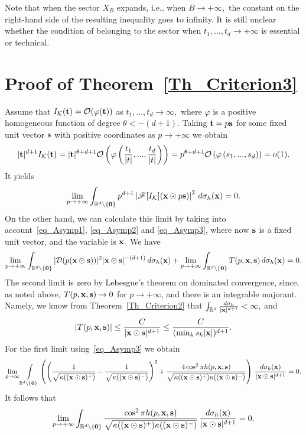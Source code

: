 \documentclass[12pt]{article}
\begin{document}
Note that when the sector $X_B$ expands, i.e., when $B\to+\infty,$ the constant on the right-hand side of the resulting inequality goes to infinity. It is still unclear whether the condition of belonging to the sector when ${{t_1,...,t_d}\to+\infty}$ is essential or technical.


\section{Proof of Theorem~\ref{Th_Criterion3}}

Assume that ${I_{\mathcal{K}}({\bf t})=\mathcal{O}(\varphi({\bf t}))}$ as ${t_1,...,t_d\to\infty},$ where $\varphi$ is a positive homogeneous function of degree ${\theta<-(d+1)}.$ Taking ${\bf t}=p{\bf s}$ for some fixed unit vector ${\bf s}$ with positive coordinates as ${p\to+\infty}$ we obtain
$$
|{\bf t}|^{d+1}I_{\mathcal{K}}({\bf t})=|{{\bf t}}|^{\theta+d+1}\mathcal{O}\left(\varphi\left(\frac{t_1}{|t|},...,\frac{t_d}{|t|}\right)\right)=p^{\theta+d+1}\mathcal{O}\left(\varphi\left(s_1,...,s_d\right)\right)=o(1).
$$
It yields 
$$
\lim_{p\to+\infty}\int_{\mathbb{R}^d\setminus\{{\bf0}\}}p^{d+1}\left|\mathscr{F}[I_{\mathcal{K}}]({\bf x}\odot p{\bf s})\right|^2\,d\sigma_h({\bf x})=0.
$$
On the other hand, we can calculate this limit by taking into account~\eqref{eq_Asymp1}, \eqref{eq_Asymp2} and \eqref{eq_Asymp3}, where now ${\bf s}$ is a fixed unit vector, and the variable is ${\bf x}.$
We have
$$
\lim_{p\to+\infty}\int_{\mathbb{R}^d\setminus\{{\bf0}\}}|\mathcal{D}(p({\bf x}\odot{\bf s}))|^2|{\bf x}\odot {\bf s}|^{-(d+1)}\,d\sigma_h({\bf x})+\lim_{p\to+\infty}\int_{\mathbb{R}^d\setminus\{{\bf0}\}}T(p,{\bf x},{\bf s})\,d\sigma_h({\bf x})=0.
$$
The second limit is zero by Lebesgue's theorem on dominated convergence, since, as noted above, ${T(p,{\bf x},{\bf s})\to0}$ for ${p\to+\infty}$, and there is an integrable majorant. Namely, we know from Theorem~\ref{Th_Criterion2} that ${\int_{\mathbb{R}^d}\frac{d\sigma_h}{|{\bf x}|^{d+1}}<\infty},$ and
$$
|T(p,{\bf x},{\bf s})|\leq\frac{C}{|{\bf x}\odot{\bf s}|^{d+1}}\leq\frac{C}{(\min_k s_k|{\bf x}|)^{d+1}}.
$$
For the first limit using~\eqref{eq_Asymp3} we obtain
$$
\lim_{p\to\infty}\int\limits_{\mathbb{R}^d\setminus\{{\bf0}\}}
\left(\left(\frac{1}{\sqrt{\kappa(({\bf x}\odot{\bf s})^+)}}-\frac{1}{\sqrt{\kappa(({\bf x}\odot{\bf s})^-)}}\right)^2+\frac{4\cos^2\pi h(p,{\bf x},{\bf s})}{\sqrt{\kappa(({\bf x}\odot{\bf s})^+)\kappa(({\bf x}\odot{\bf s})^-)}}\right)\,\frac{d\sigma_h({\bf{x}})}{|{\bf x}\odot{\bf s}|^{d+1}}=0.
$$
It follows that
$$
\lim_{p\to+\infty}\int_{\mathbb{R}^d\setminus\{{\bf0}\}}\frac{\cos^2\pi h(p,{\bf x},{\bf s})}{\sqrt{\kappa(({\bf x}\odot{\bf s})^+)\kappa(({\bf x}\odot{\bf s})^-)}}\,\frac{d\sigma_h({\bf{x}})}{|{\bf x}\odot{\bf s}|^{d+1}}=0.
$$
\end{document}
